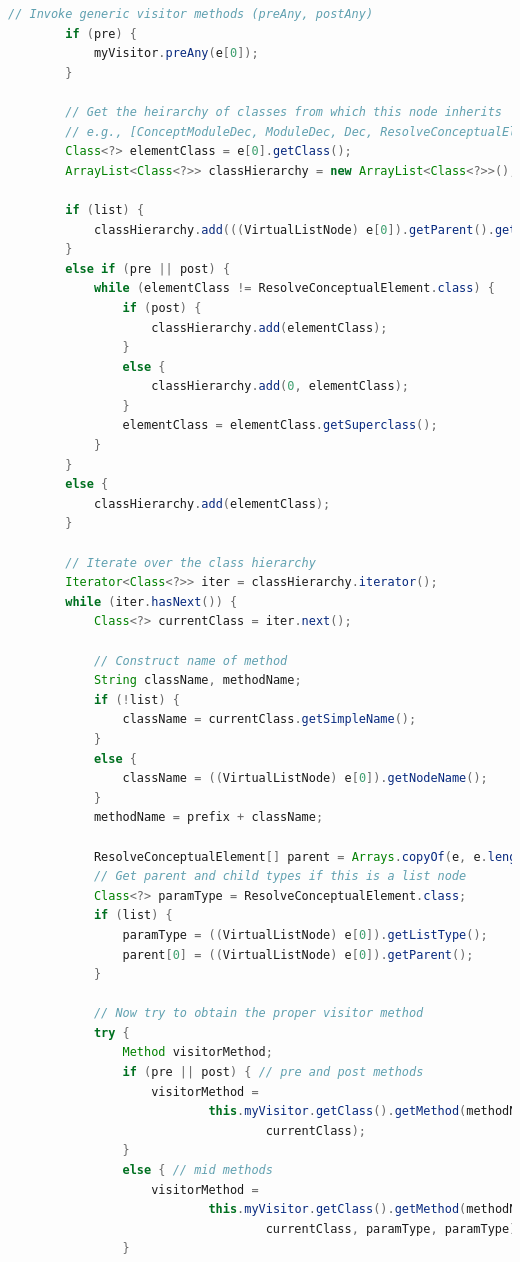 \documentclass[times]{speauth}
\begin{document}
\begin{lstlisting}[language=java,caption={TreeWalker.java}]
        // Invoke generic visitor methods (preAny, postAny)
        if (pre) {
            myVisitor.preAny(e[0]);
        }

        // Get the heirarchy of classes from which this node inherits
        // e.g., [ConceptModuleDec, ModuleDec, Dec, ResolveConceptualElement]
        Class<?> elementClass = e[0].getClass();
        ArrayList<Class<?>> classHierarchy = new ArrayList<Class<?>>();

        if (list) {
            classHierarchy.add(((VirtualListNode) e[0]).getParent().getClass());
        }
        else if (pre || post) {
            while (elementClass != ResolveConceptualElement.class) {
                if (post) {
                    classHierarchy.add(elementClass);
                }
                else {
                    classHierarchy.add(0, elementClass);
                }
                elementClass = elementClass.getSuperclass();
            }
        }
        else {
            classHierarchy.add(elementClass);
        }

        // Iterate over the class hierarchy
        Iterator<Class<?>> iter = classHierarchy.iterator();
        while (iter.hasNext()) {
            Class<?> currentClass = iter.next();

            // Construct name of method
            String className, methodName;
            if (!list) {
                className = currentClass.getSimpleName();
            }
            else {
                className = ((VirtualListNode) e[0]).getNodeName();
            }
            methodName = prefix + className;

            ResolveConceptualElement[] parent = Arrays.copyOf(e, e.length);
            // Get parent and child types if this is a list node
            Class<?> paramType = ResolveConceptualElement.class;
            if (list) {
                paramType = ((VirtualListNode) e[0]).getListType();
                parent[0] = ((VirtualListNode) e[0]).getParent();
            }

            // Now try to obtain the proper visitor method
            try {
                Method visitorMethod;
                if (pre || post) { // pre and post methods
                    visitorMethod =
                            this.myVisitor.getClass().getMethod(methodName,
                                    currentClass);
                }
                else { // mid methods
                    visitorMethod =
                            this.myVisitor.getClass().getMethod(methodName,
                                    currentClass, paramType, paramType);
                }


\end{lstlisting}
\end{document}
